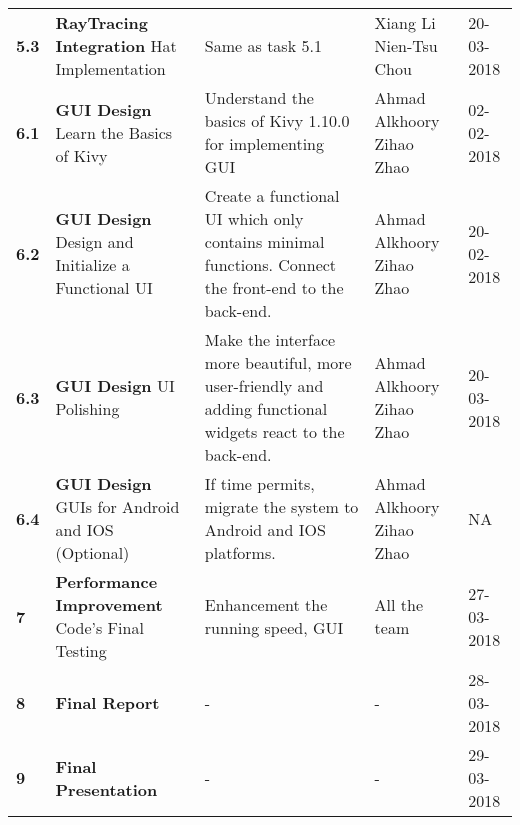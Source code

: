 \documentclass{article}
\begin{document}
\begin{center}
\begin{tabular}{|lp{4.5cm}p{5cm}p{3.5cm}l|}
\textbf{5.3} & \textbf{RayTracing Integration} \newline Hat Implementation & Same as task 5.1 & Xiang Li \newline Nien-Tsu Chou & 20-03-2018 \\

\textbf{6.1}	& \textbf{GUI Design} \newline Learn the Basics of Kivy & Understand the basics of Kivy 1.10.0 for implementing GUI & Ahmad Alkhoory \newline Zihao Zhao & 02-02-2018 \\

\textbf{6.2} & \textbf{GUI Design} \newline Design and Initialize a Functional UI & Create a functional UI which only contains minimal functions. Connect the front-end to the back-end. & Ahmad Alkhoory \newline Zihao Zhao & 20-02-2018 \\

\textbf{6.3}	& \textbf{GUI Design} \newline UI Polishing	& Make the interface more beautiful, more user-friendly and adding functional widgets react to the back-end. & Ahmad Alkhoory \newline Zihao Zhao & 20-03-2018 \\

\textbf{6.4} & \textbf{GUI Design} \newline GUIs for Android and IOS (Optional) & If time permits, migrate the system to Android and IOS platforms. & Ahmad Alkhoory \newline Zihao Zhao & NA \\

\textbf{7} & \textbf{Performance Improvement} \newline Code's Final Testing & Enhancement the running speed, GUI & All the team & 27-03-2018 \\

\textbf{8} & \textbf{Final Report} & - & - & 28-03-2018 \\

\textbf{9} & \textbf{Final Presentation} & - & - & 29-03-2018 \\


\hline

\end{tabular}
\end{center}

\end{document}
